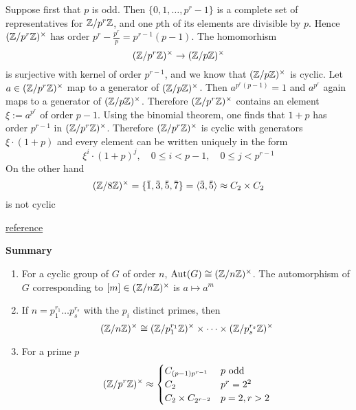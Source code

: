 \documentclass[11pt]{article}
\begin{document}
Suppose first that \(p\) is odd. Then \(\{0,1,\dots,p^r-1\}\) is a complete set of representatives
for \(\mathbb{Z}/p^r\mathbb{Z}\), and one \(p\)th of its elements are divisible by \(p\). Hence \((\mathbb{Z}/p^r\mathbb{Z})^{\times}\) has
order \(p^r-\frac{p^r}{p}=p^{r-1}(p-1)\). The homomorhism
\begin{equation*}
(\mathbb{Z}/p^r\mathbb{Z})^\times\to(\mathbb{Z}/p\mathbb{Z})^\times
\end{equation*}
is surjective with kernel of order \(p^{r-1}\), and we know that \((\mathbb{Z}/p\mathbb{Z})^\times\) is cyclic.
Let \(a\in(\mathbb{Z}/p^r\mathbb{Z})^\times\) map to a generator of \((\mathbb{Z}/p\mathbb{Z})^\times\). Then \(a^{p^r(p-1)}=1\) and \(a^{p^r}\)
again maps to a generator of \((\mathbb{Z}/p\mathbb{Z})^\times\). Therefore \((\mathbb{Z}/p^r\mathbb{Z})^\times\) contains an
element \(\xi:=a^{p^r}\) of order \(p-1\). Using the binomial theorem, one finds that \(1+p\) has
order \(p^{r-1}\) in \((\mathbb{Z}/p^r\mathbb{Z})^\times\). Therefore \((\mathbb{Z}/p^r\mathbb{Z})^\times\) is cyclic with
generators \(\xi\cdot(1+p)\) and every element can be written uniquely in the form
\begin{equation*}
\xi^i\cdot(1+p)^j,\quad 0\le i<p-1,\quad 0\le j<p^{r-1}
\end{equation*}
On the other hand
\begin{equation*}
(\Z/8\Z)^\times=\{\bbar{1},\bbar{3},\bbar{5},\bbar{7}\}=\la\bbar{3},\bbar{5}\ra\approx C_2\times C_2
\end{equation*}
is not cyclic

\href{http://ramanujan.math.trinity.edu/rdaileda/teach/s18/m3341/ZnZ.pdf}{reference}

\textbf{Summary}
\begin{enumerate}
\item For a cyclic group of \(G\) of order \(n\), \(\operatorname{\text{Aut}}(G)\cong(\mathbb{Z}/n\mathbb{Z})^\times\). The automorphism of \(G\)
corresponding to \([m]\in(\mathbb{Z}/n\mathbb{Z})^{\times}\) is \(a\mapsto a^m\)
\item If \(n=p_1^{r_1}\dots p_s^{r_s}\) with the \(p_i\) distinct primes, then
\begin{equation*}
(\mathbb{Z}/n\mathbb{Z})^\times\cong(\mathbb{Z}/p_1^{r_1}\mathbb{Z})^\times \times\dots\times(\mathbb{Z}/p_s^{r_s}\mathbb{Z})^\times
\end{equation*}
\item For a prime \(p\)
\begin{equation*}
(\mathbb{Z}/p^r\mathbb{Z})^\times\approx
\begin{cases}
C_{(p-1)p^{r-1}}&p\text{ odd}\\
C_2&p^r=2^2\\
C_2\times C_{2^{r-2}}&p=2,r>2
\end{cases}
\end{equation*}
\end{enumerate}
\end{document}
